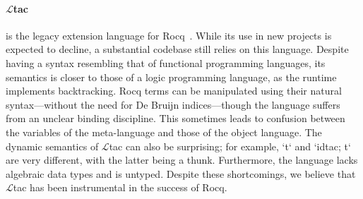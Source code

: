 \documentclass[sigplan,natbib=false]{acmart}
\begin{document}
\paragraph{
$\mathcal{L}$tac} is the legacy extension language for
Rocq~\cite{10.5555/1765236.1765246}. While its use in new projects is expected
to decline, a substantial codebase still relies on this language. Despite
having a syntax resembling that of functional programming languages, its
semantics is closer to those of a logic programming language, as the runtime
implements backtracking. Rocq terms can be manipulated using their natural
syntax—without the need for De Bruijn indices—though the language suffers from
an unclear binding discipline. This sometimes leads to confusion between the
variables of the meta-language and those of the object language. The dynamic
semantics of $\mathcal{L}$tac can also be surprising; for example, `t` and
`idtac; t` are very different, with the latter being a thunk. Furthermore, the
language lacks algebraic data types and is untyped. Despite these shortcomings,
we believe that $\mathcal{L}$tac has been instrumental in the success of Rocq.
\end{document}
